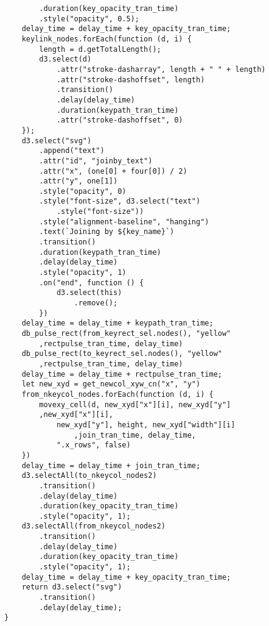 \begin{lstlisting}
        .duration(key_opacity_tran_time)
        .style("opacity", 0.5);
    delay_time = delay_time + key_opacity_tran_time;
    keylink_nodes.forEach(function (d, i) {
        length = d.getTotalLength();
        d3.select(d)
            .attr("stroke-dasharray", length + " " + length)
            .attr("stroke-dashoffset", length)
            .transition()
            .delay(delay_time)
            .duration(keypath_tran_time)
            .attr("stroke-dashoffset", 0)
    });
    d3.select("svg")
        .append("text")
        .attr("id", "joinby_text")
        .attr("x", (one[0] + four[0]) / 2)
        .attr("y", one[1])
        .style("opacity", 0)
        .style("font-size", d3.select("text")
            .style("font-size"))
        .style("alignment-baseline", "hanging")
        .text(`Joining by ${key_name}`)
        .transition()
        .duration(keypath_tran_time)
        .delay(delay_time)
        .style("opacity", 1)
        .on("end", function () {
            d3.select(this)
                .remove();
        })
    delay_time = delay_time + keypath_tran_time;
    db_pulse_rect(from_keyrect_sel.nodes(), "yellow"
        ,rectpulse_tran_time, delay_time)
    db_pulse_rect(to_keyrect_sel.nodes(), "yellow"
        ,rectpulse_tran_time, delay_time)
    delay_time = delay_time + rectpulse_tran_time;
    let new_xyd = get_newcol_xyw_cn("x", "y")
    from_nkeycol_nodes.forEach(function (d, i) {
        movexy_cell(d, new_xyd["x"][i], new_xyd["y"]
        ,new_xyd["x"][i],
            new_xyd["y"], height, new_xyd["width"][i]
                ,join_tran_time, delay_time,
            ".x_rows", false)
    })
    delay_time = delay_time + join_tran_time;
    d3.selectAll(to_nkeycol_nodes2)
        .transition()
        .delay(delay_time)
        .duration(key_opacity_tran_time)
        .style("opacity", 1);
    d3.selectAll(from_nkeycol_nodes2)
        .transition()
        .delay(delay_time)
        .duration(key_opacity_tran_time)
        .style("opacity", 1);
    delay_time = delay_time + key_opacity_tran_time;
    return d3.select("svg")
        .transition()
        .delay(delay_time);
}


\end{lstlisting}
